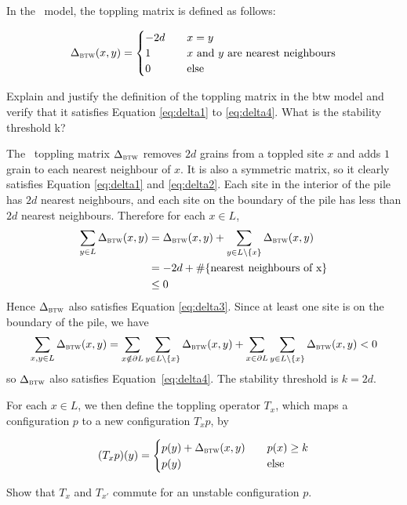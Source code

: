 In the \btw\ model, the toppling matrix is defined as follows:

\[
\Delta_{\textsc{btw}}(x,y)=\begin{cases}
    -2d \quad & x=y\\
    1 & \text{$x$ and $y$ are nearest neighbours}\\
    0 & \text{else}
\end{cases}
\]


\begin{question}
    Explain and justify the definition of the toppling matrix in the btw model and verify that it satisfies Equation \ref{eq:delta1} to \ref{eq:delta4}.
    What is the stability threshold k?
\end{question}

The \btw\ toppling matrix $\Delta_{\textsc{btw}}$ removes $2d$ grains from a toppled site $x$ and adds $1$ grain to each nearest neighbour of $x$. It is also a symmetric matrix, so it clearly satisfies Equation \ref{eq:delta1} and \ref{eq:delta2}. Each site in the interior of the pile has $2d$ nearest neighbours, and each site on the boundary of the pile has less than $2d$ nearest neighbours. Therefore for each $x\in L$,
\begin{align*}
    \sum_{y\in L}\Delta_{\textsc{btw}}(x,y) &= \Delta_{\textsc{btw}}(x,y) +  \sum_{y\in L\setminus \{x\}} \Delta_{\textsc{btw}}(x,y) \\
    & = -2d + \#\{\text{nearest neighbours of x}\} \\
    & \le 0
\end{align*}
Hence $\Delta_{\textsc{btw}}$ also satisfies Equation \ref{eq:delta3}. Since at least one site is on the boundary of the pile, we have
\[ \sum_{x,y\in L}\Delta_{\textsc{btw}}(x,y) = \sum_{x\notin \partial L}\sum_{y\in L\setminus \{x\}} \Delta_{\textsc{btw}}(x,y) + \sum_{x\in \partial L}\sum_{y\in L\setminus \{x\}} \Delta_{\textsc{btw}}(x,y) < 0 \]
so $\Delta_{\textsc{btw}}$ also satisfies Equation~\ref{eq:delta4}. The stability threshold is $k=2d$.

For each $x\in L$, we then define the toppling operator $T_x$, which maps a configuration $p$ to a new configuration $T_xp$, by

\[
(T_xp)(y)=\begin{cases}
    p(y) + \Delta_{\textsc{btw}}(x,y) \quad & p(x)\ge k\\
    p(y) & \text{else}
\end{cases}
\]

\begin{question}
    Show that $T_x$ and $T_{x'}$ commute for an unstable configuration $p$.
\end{question}

